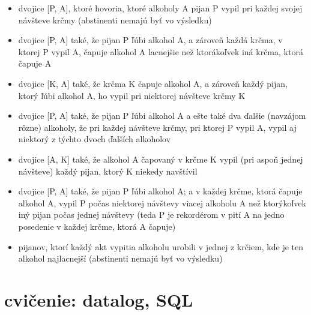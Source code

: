 \documentclass[10pt, a4paper]{article}
\begin{document}
\begin{enumerate}
\begin{itemize}
    \item dvojice [P, A], ktoré hovoria, ktoré alkoholy A pijan P vypil pri každej svojej návšteve krčmy (abstinenti nemajú byť vo výsledku)
    \item dvojice [P, A] také, že pijan P ľúbi alkohol A, a zároveň každá krčma, v ktorej P vypil A, čapuje alkohol A lacnejšie než ktorákoľvek iná krčma, ktorá čapuje A
    \item dvojice [K, A] také, že krčma K čapuje alkohol A, a zároveň každý pijan, ktorý ľúbi alkohol A, ho vypil pri niektorej návšteve krčmy K
    \item dvojice [P, A] také, že pijan P ľúbi alkohol A a ešte také dva ďalšie (navzájom rôzne) alkoholy, že pri každej návšteve krčmy,
            pri ktorej P vypil A, vypil aj niektorý z týchto dvoch ďalších alkoholov
    \item dvojice [A, K] také, že alkohol A čapovaný v krčme K vypil (pri aspoň jednej návšteve) každý pijan, ktorý K niekedy navštívil
    \item dvojice [P, A] také, že pijan P ľúbi alkohol A; a v každej krčme, ktorá čapuje alkohol A, vypil P počas niektorej
            návštevy viacej alkoholu A než ktorýkoľvek iný pijan počas jednej návštevy (teda P je rekordérom v pití A na jedno posedenie v každej krčme, ktorá A čapuje)
    \item pijanov, ktorí každý akt vypitia alkoholu urobili v jednej z krčiem, kde je ten alkohol najlacnejší (abstinenti nemajú byť vo výsledku)    
\end{itemize}

\end{enumerate}



\section{cvičenie: datalog, SQL}
\end{document}
